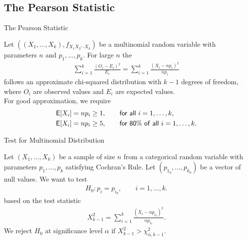 \subsection{The Pearson Statistic}

\begin{frame}{The Pearson Statistic}

\justifying
{} Let $((X_1, \ldots, X_k), f_{X_1X_2\cdots X_k})$ be a multinomial random variable with parameters $n$ and $p_1, \ldots, p_k$. For large $n$ the 
\begin{align*}
\sum_{i=1}^k \frac{(O_i-E_i)^2}{E_i} = \sum_{i=1}^k \frac{(X_i-np_i)^2}{np_i}
\end{align*}
follows an approximate chi-squared distribution with $k-1$ degrees of freedom, where $O_i$ are observed values and $E_i$ are expected values. \\
 For good approximation, we require
\begin{align*}
\mathsf{E}[X_i] & = np_i \geq 1, \qquad \mathsf{for\ all\ } i = 1, \ldots, k,\\
\mathsf{E}[X_i] & = np_i \geq 5, \qquad \mathsf{for\ 80\%\ of\ all\ } i = 1,\ldots, k.
\end{align*}

\end{frame}

\begin{frame}{Test for Multinomial Distribution}

\justifying
{} Let $(X_1, \ldots, X_k)$ be a sample of size $n$ from a categorical random variable with parameters $p_1, \ldots, p_k$ satisfying Cochran's Rule. Let $(p_{1_0}, \ldots, p_{k_0})$ be a vector of null values. We want to test
\begin{align*}
H_0: p_i = p_{i_0}, \qquad i = 1,\ldots, k.
\end{align*}
based on the test statistic
\begin{align*}
X_{k-1}^2 = \sum_{i=1}^k \frac{(X_i - np_{i_0})^2}{np_{i_0}}.
\end{align*}
We reject $H_0$ at significance level $\alpha$ if $X_{k-1}^2 > \chi_{\alpha,k-1}^2$.

\end{frame}


